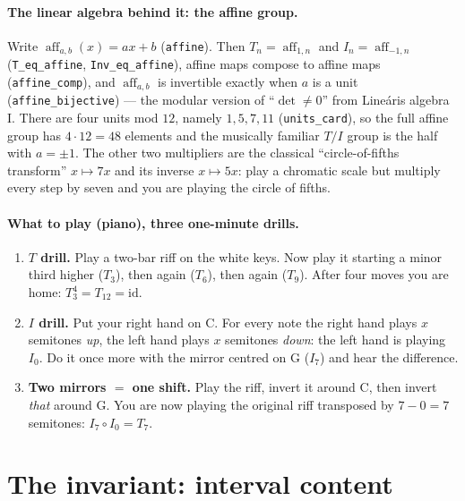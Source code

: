 \documentclass[11pt,a4paper]{article}
\newcommand{\lean}[1]{\texttt{#1}}
\begin{document}
\paragraph{The linear algebra behind it: the affine group.}
Write $\operatorname{aff}_{a,b}(x)=ax+b$ (\lean{affine}). Then $T_n=\operatorname{aff}_{1,n}$
and $I_n=\operatorname{aff}_{-1,n}$ (\lean{T\_eq\_affine}, \lean{Inv\_eq\_affine}), affine
maps compose to affine maps (\lean{affine\_comp}), and $\operatorname{aff}_{a,b}$ is
invertible exactly when $a$ is a unit (\lean{affine\_bijective}) --- the modular
version of ``$\det\neq 0$'' from Lineáris algebra I. There are four units mod $12$,
namely $1,5,7,11$ (\lean{units\_card}), so the full affine group has $4\cdot 12=48$
elements and the musically familiar $T/I$ group is the half with $a=\pm1$. The
other two multipliers are the classical ``circle-of-fifths transform'' $x\mapsto 7x$
and its inverse $x\mapsto 5x$: play a chromatic scale but multiply every step by
seven and you are playing the circle of fifths.

\paragraph{What to play (piano), three one-minute drills.}
\begin{enumerate}[leftmargin=1.6em]
\item \textbf{$T$ drill.} Play a two-bar riff on the white keys. Now play it
      starting a minor third higher ($T_3$), then again ($T_6$), then again
      ($T_9$). After four moves you are home: $T_3^4=T_{12}=\mathrm{id}$.
\item \textbf{$I$ drill.} Put your right hand on C. For every note the right hand
      plays $x$ semitones \emph{up}, the left hand plays $x$ semitones
      \emph{down}: the left hand is playing $I_0$. Do it once more with the mirror
      centred on G ($I_7$) and hear the difference.
\item \textbf{Two mirrors $=$ one shift.} Play the riff, invert it around C,
      then invert \emph{that} around G. You are now playing the original riff
      transposed by $7-0=7$ semitones: $I_7\circ I_0=T_7$.
\end{enumerate}

\section{The invariant: interval content}
\end{document}
